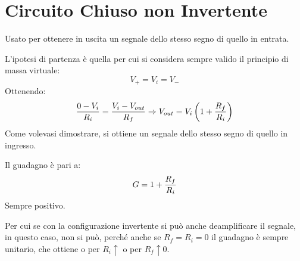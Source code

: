 \documentclass[a4paper, 15pt]{article}
\begin{document}
\section{Circuito Chiuso non Invertente}
\begin{adjustwidth}{2in}{}   		
   		Usato per ottenere in uscita un segnale dello stesso segno di quello in entrata. 
\begin{figure}[H]
	\centering
\end{figure}
   		L'ipotesi di partenza è quella per cui si considera sempre valido il principio di massa virtuale:
   		\[V_+ = V_i = V_-\]
   		Ottenendo:
   		\[{0-V_i\over R_i} = {V_i-V_{out}\over R_f} \Rightarrow V_{out} = V_i\left(1 + {R_f\over R_i}\right)\]
   		Come volevasi dimostrare, si ottiene un segnale dello stesso segno di quello in ingresso. \newline 
   		
   		Il guadagno è pari a:
   		\[G = 1 + {R_f\over R_i}\]
   		Sempre positivo.
   		
   		Per cui se con la configurazione invertente si può anche deamplificare il segnale, in questo caso, non si può, perché anche se $ R_f=R_i=0$ il guadagno è sempre unitario, che ottiene o per $R_i\uparrow$ o per $R_f\uparrow0$. \newline 
\end{adjustwidth}
\end{document}

